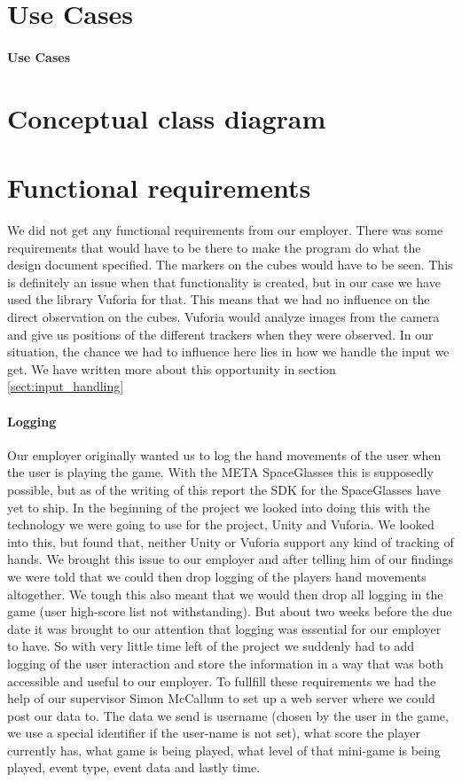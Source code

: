 \section{Use Cases}

\paragraph{Use Cases}

\section{Conceptual class diagram}

\section{Functional requirements}
We did not get any functional requirements from our employer. There was
some requirements that would have to be there to make the program do what the
design document specified. The markers on the cubes would have to be seen. This
is definitely an issue when that functionality is created, but in our case we
have used the library \gls{Vuforia} for that. This means that we had no
influence on the direct observation on the cubes. Vuforia would analyze images
from the camera and give us positions of the different trackers when they were
observed. In our situation, the chance we had to influence here lies in how we
handle the input we get. We have written more about this opportunity in section
\ref{sect:input_handling}

\paragraph{Logging}
Our employer originally wanted us to log the hand movements of the user when the user is playing the game. With the META SpaceGlasses this is supposedly possible, but as of the writing of this report the SDK for the SpaceGlasses have yet to ship. In the beginning of the project we looked into doing this with the technology we were going to use for the project, Unity and Vuforia. We looked into this, but found that, neither Unity or Vuforia support any kind of tracking of hands. We brought this issue to our employer and after telling him of our findings we were told that we could then drop logging of the players hand movements altogether.
We tough this also meant that we would then drop all logging in the game (user high-score list not withstanding). But about two weeks before the due date it was brought to our attention that logging was essential for our employer to have. So with very little time left of the project we suddenly had to add logging of the user interaction and store the information in a way that was both accessible and useful to our employer.
To fullfill these requirements we had the help of our supervisor Simon McCallum to set up a web server where we could post our data to.
The data we send is username (chosen by the user in the game, we use a special identifier if the user-name is not set), what score the player currently has, what game is being played, what level of that mini-game is being played, event type, event data and lastly time. 

